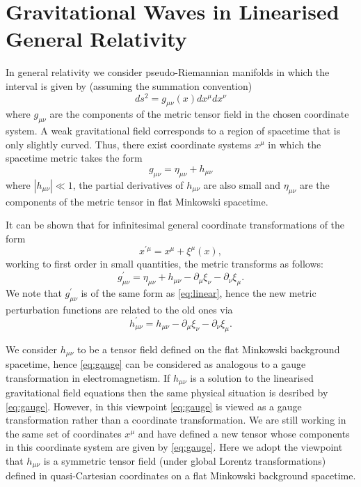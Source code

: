 \appendix
\section{\large Gravitational Waves in Linearised General Relativity}\label{sec:appendix}

In general relativity we consider pseudo-Riemannian manifolds in which
the interval is given by (assuming the summation convention) 
\begin{equation}
ds^2=g_{\mu\nu}(x)dx^{\mu}dx^{\nu}
\end{equation}
where $g_{\mu\nu}$ are the components of the metric tensor field in
the chosen coordinate system. A weak gravitational field corresponds
to a region of spacetime that is only slightly curved. Thus, there
exist coordinate systems $x^{\mu}$ in which the spacetime metric takes
the form
\begin{equation}\label{eq:linear}
g_{\mu\nu} = \eta_{\mu\nu} + h_{\mu\nu}
\end{equation}
where $|h_{\mu\nu}| \ll 1$, the partial derivatives of $h_{\mu\nu}$
are also small and $\eta_{\mu\nu}$ are the components of the metric
tensor in flat Minkowski spacetime.

It can be shown that for infinitesimal general coordinate
transformations of the form
\begin{equation}
x^{\prime\mu} = x^{\mu}+\xi^{\mu}(x),
\end{equation}
working to first order in small quantities, the metric transforms as
follows:
\begin{equation}
g^{\prime}_{\mu\nu} = \eta_{\mu\nu} + h_{\mu\nu} - \partial_\mu\xi_\nu
- \partial_\nu\xi_\mu.
\end{equation}
We note that $g^{\prime}_{\mu\nu}$ is of the same form
as \eqref{eq:linear}, hence the new metric perturbation functions are
related to the old ones via
\begin{equation}\label{eq:gauge}
h^{\prime}_{\mu\nu} = h_{\mu\nu} - \partial_\mu\xi_\nu
- \partial_\nu\xi_\mu.
\end{equation}

We consider $h_{\mu\nu}$ to be a tensor field defined on the flat
Minkowski background spacetime, hence \eqref{eq:gauge} can be
considered as analogous to a gauge transformation in
electromagnetism. If $h_{\mu\nu}$ is a solution to the linearised
gravitational field equations then the same
physical situation is desribed by \eqref{eq:gauge}. However, in this
viewpoint \eqref{eq:gauge} is viewed as a gauge transformation rather
than a coordinate transformation. We are still working in the same set
of coordinates $x^\mu$ and have defined a new tensor whose components
in this coordinate system are given by \eqref{eq:gauge}. Here we adopt
the viewpoint that $h_{\mu\nu}$ is a symmetric tensor field (under
global Lorentz transformations) defined in quasi-Cartesian coordinates
on a flat Minkowski background spacetime.

